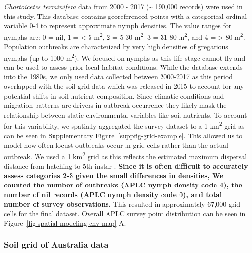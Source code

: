 \documentclass[
]{article}
\begin{document}
\emph{Chortoicetes terminifera} data from 2000 - 2017 (\textasciitilde{}
190,000 records) were used in this study. This database contains
georeferenced points with a categorical ordinal variable 0-4 to
represent approximate nymph densities. The value ranges for nymphs are:
0 = nil, 1 = \textless{} 5 m\textsuperscript{2}, 2 = 5-30
m\textsuperscript{2}, 3 = 31-80 m\textsuperscript{2}, and 4 =
\textgreater{} 80 m\textsuperscript{2}. Population outbreaks are
characterized by very high densities of gregarious nymphs (up to 1000
m\textsuperscript{2}). We focused on nymphs as this life stage cannot
fly and can be used to assess prior local habitat conditions. While the
database extends into the 1980s, we only used data collected between
2000-2017 as this period overlapped with the soil grid data which was
released in 2015 to account for any potential shifts in soil nutrient
composition. Since climatic conditions and migration patterns are
drivers in outbreak occurrence
\citep{lawton_seeing_2022, veran_modeling_2015} they likely mask the
relationship between static environmental variables like soil nutrients.
To account for this variability, we spatially aggregated the survey
dataset to a 1 km\textsuperscript{2} grid as can be seen in
Supplementary Figure~\ref{suppfig-grid-example}. This allowed us to
model how often locust outbreaks occur in grid cells rather than the
actual outbreak. We used a 1 km\textsuperscript{2} grid as this reflects
the estimated maximum dispersal distance from hatching to 5th instar
\citep{hunter_aerial_2008}. \textbf{Since it is often difficult to
accurately assess categories 2-3 given the small differences in
densities, We counted the number of outbreaks (APLC nymph density code
4), the number of nil records (APLC nymph density code 0), and total
number of survey observations.} This resulted in approximately 67,000
grid cells for the final dataset. Overall APLC survey point distribution
can be seen in Figure~\ref{fig-spatial-modeling-env-map} A.

\subsubsection{Soil grid of Australia
data}\label{soil-grid-of-australia-data}
\end{document}
